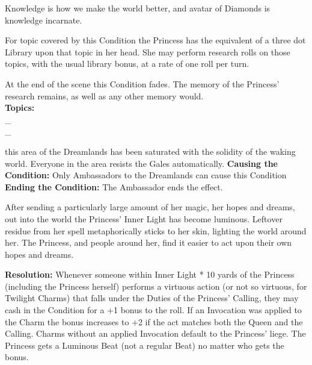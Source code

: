 \documentclass[10pt, frontgrid, backgrid]{flacards}
\begin{document}
{Knowledge is how we make the world better, and avatar of Diamonds is knowledge incarnate. 

For topic covered by this Condition the Princess has the equivalent of a three dot Library upon that topic in her head. She may perform research rolls on those topics, with the usual library bonus, at a rate of one roll per turn. 

At the end of the scene this Condition fades. The memory of the Princess' research remains, as well as any other memory would. \\

\textbf{Topics:} \fillunderline\\\_\fillunderline\\\_\fillunderline}


{this area of the Dreamlands has been saturated with the solidity of the waking world. Everyone in the area resists the Gales automatically.
\textbf{Causing the Condition:} Only Ambassadors to the Dreamlands can cause this Condition\\
\textbf{Ending the Condition:} The Ambassador ends the effect.}

{After sending a particularly large amount of her magic, her hopes and dreams, out into the world the Princess' Inner Light has become luminous. Leftover residue from her spell metaphorically sticks to her skin, lighting the world around her. The Princess, and people around her, find it easier to act upon their own hopes and dreams.  

\textbf{Resolution:} Whenever someone within Inner Light * 10 yards of the Princess (including the Princess herself) performs a virtuous action (or not so virtuous, for Twilight Charms) that falls under the Duties of the Princess' Calling, they may cash in the Condition for a +1 bonus to the roll. If an Invocation was applied to the Charm the bonus increases to +2 if the act matches both the Queen and the Calling. Charms without an applied Invocation default to the Princess' liege. The Princess gets a Luminous Beat (not a regular Beat) no matter who gets the bonus.}

\end{document}
